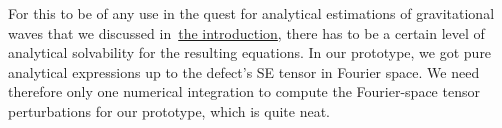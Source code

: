 For this to be of any use in the quest for analytical estimations of gravitational waves that we discussed in~\hyperlink{sentence1}{the introduction}, there has to be a certain level of analytical solvability for the resulting equations. In our prototype, we got pure analytical expressions up to the defect's SE tensor in Fourier space. We need therefore only one numerical integration to compute the Fourier-space tensor perturbations for our prototype, which is quite neat. %


















